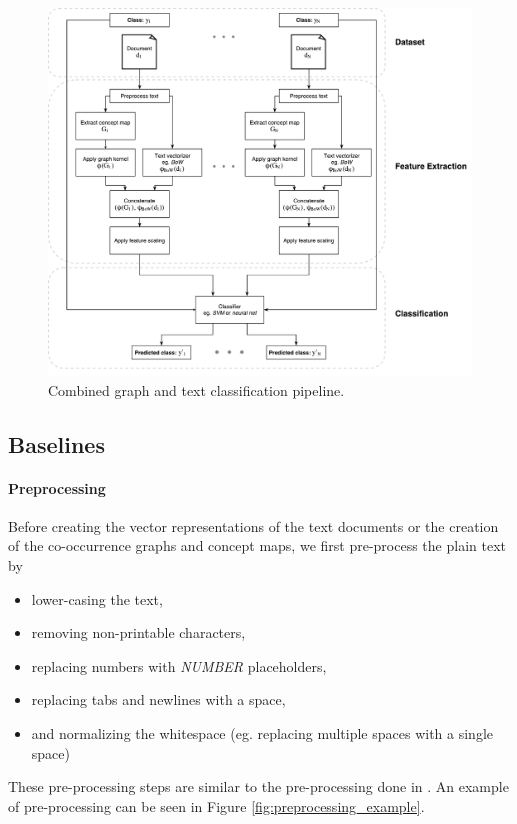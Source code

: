 \begin{figure}[htb!]
	\centering
	\includegraphics[width=0.7\linewidth]{assets/figures/graph_classification_phi_combined_text.pdf}
	\caption[Diagram: Graph kernel and text combined text classification]{Combined graph and text classification pipeline.}
\end{figure}

\subsection{Baselines}
\paragraph{Preprocessing}
Before creating the vector representations of the text documents or the creation of the co-occurrence graphs and concept maps, we first pre-process the plain text by

\begin{itemize}
\item{lower-casing the text,}
\item{removing non-printable characters,}
\item{replacing numbers with \textit{NUMBER} placeholders,}
\item{replacing tabs and newlines with a space,}
\item{and normalizing the whitespace (eg. replacing multiple spaces with a single space)}
\end{itemize}
These pre-processing steps are similar to the pre-processing done in \cite{Cachopo2007}.
An example of pre-processing can be seen in Figure \ref{fig:preprocessing_example}.

